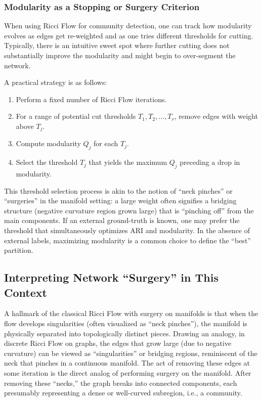 \subsubsection{Modularity as a Stopping or Surgery Criterion}
When using Ricci Flow for community detection, one can track how modularity evolves as edges get re-weighted and as one tries different thresholds for cutting. Typically, there is an intuitive sweet spot where further cutting does not substantially improve the modularity and might begin to over-segment the network. 

A practical strategy is as follows:
\begin{enumerate}
    \item Perform a fixed number of Ricci Flow iterations. 
    \item For a range of potential cut thresholds $T_1, T_2, \dots, T_r$, remove edges with weight above $T_j$. 
    \item Compute modularity $Q_j$ for each $T_j$.
    \item Select the threshold $T_j$ that yields the maximum $Q_j$ preceding a drop in modularity.
\end{enumerate}
This threshold selection process is akin to the notion of “neck pinches” or “surgeries” in the manifold setting: a large weight often signifies a bridging structure (negative curvature region grown large) that is “pinching off” from the main components. If an external ground-truth is known, one may prefer the threshold that simultaneously optimizes ARI and modularity. In the absence of external labels, maximizing modularity is a common choice to define the “best” partition.

\subsection{Interpreting Network ``Surgery'' in This Context}
\label{subsec:surgery}

A hallmark of the classical Ricci Flow with surgery on manifolds is that when the flow develops singularities (often visualized as “neck pinches”), the manifold is physically separated into topologically distinct pieces. Drawing an analogy, in discrete Ricci Flow on graphs, the edges that grow large (due to negative curvature) can be viewed as “singularities” or bridging regions, reminiscent of the neck that pinches in a continuous manifold. The act of removing these edges at some iteration is the direct analog of performing surgery on the manifold. After removing these “necks,” the graph breaks into connected components, each presumably representing a dense or well-curved subregion, i.e., a community.

